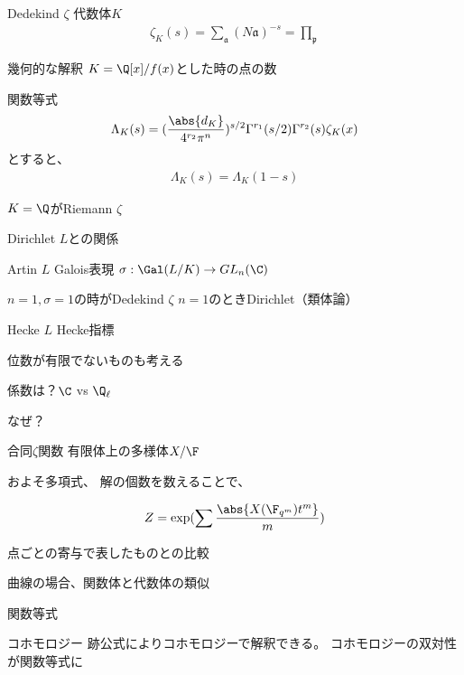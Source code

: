 \documentclass[dvipdfmx]{beamer}
\begin{document}
\begin{frame}{Dedekind $\zeta$}
  代数体$K$
  \begin{align*}
    \zeta_K(s)=\sum_{\mathfrak{a}}(N\mathfrak{a})^{-s}
    =\prod_{\mathfrak{p}}
  \end{align*}

  幾何的な解釈
  $K=\Q[x]/f(x)$とした時の点の数

  関数等式
  \begin{align*}
    \Lambda_K(s)=(\frac{\abs{d_K}}{4^{r_2}\pi^n})^{s/2}\Gamma^{r_1}(s/2)\Gamma^{r_2}(s)\zeta_K(x)
  \end{align*}
  とすると、
  \begin{align*}
    \Lambda_K(s)=\Lambda_K(1-s)
  \end{align*}
  
  $K=\Q$がRiemann $\zeta$

  Dirichlet $L$との関係
\end{frame}

\begin{frame}{Artin $L$}
  Galois表現
  $\sigma:\Gal(L/K) \to GL_n(\C)$

  $n=1, \sigma=1$の時がDedekind $\zeta$
  $n=1$のときDirichlet（類体論）
\end{frame}

\begin{frame}{Hecke $L$}
  Hecke指標

  位数が有限でないものも考える

  係数は？$\C$ vs $\Q_\ell$

  なぜ？
\end{frame}

\begin{frame}{合同$\zeta$関数}
  有限体上の多様体$X/\F$

  およそ多項式、
  解の個数を数えることで、

  \begin{align*}
    Z=\exp(\sum\frac{\abs{X(\F_{q^m})t^m}}{m})
  \end{align*}  

  点ごとの寄与で表したものとの比較

  曲線の場合、関数体と代数体の類似

  関数等式
\end{frame}

\begin{frame}{コホモロジー}
  跡公式によりコホモロジーで解釈できる。
  コホモロジーの双対性が関数等式に
\end{frame}
\end{document}
